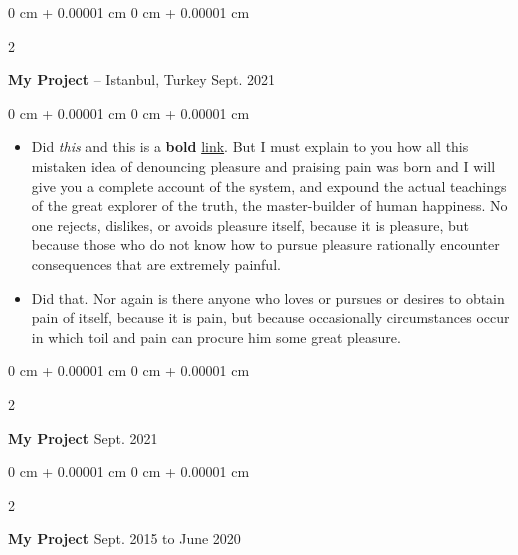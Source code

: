 \documentclass[10pt, letterpaper]{article}
\newenvironment{highlights}{
    \begin{itemize}[
        topsep=0.10 cm,
        parsep=0.10 cm,
        partopsep=0pt,
        itemsep=0pt,
        leftmargin=0 cm + 10pt
    ]
}{
    \end{itemize}
} %
\newenvironment{onecolentry}{
    \begin{adjustwidth}{
        0 cm + 0.00001 cm
    }{
        0 cm + 0.00001 cm
    }
}{
    \end{adjustwidth}
} %
\newenvironment{twocolentry}[2][]{
    \onecolentry
    \def\secondColumn{#2}
    \setcolumnwidth{\fill, 4.5 cm}
    \begin{paracol}{2}
}{
    \switchcolumn \raggedleft \secondColumn
    \end{paracol}
    \endonecolentry
} %
\begin{document}
        \vspace{0.2 cm}

        \begin{twocolentry}{
            Sept. 2021
        }
            \textbf{My Project} -- Istanbul, Turkey\end{twocolentry}

        \vspace{0.10 cm}
        \begin{onecolentry}
            \begin{highlights}
                \item Did \textit{this} and this is a \textbf{bold} \href{https://example.com}{link}. But I must explain to you how all this mistaken idea of denouncing pleasure and praising pain was born and I will give you a complete account of the system, and expound the actual teachings of the great explorer of the truth, the master-builder of human happiness. No one rejects, dislikes, or avoids pleasure itself, because it is pleasure, but because those who do not know how to pursue pleasure rationally encounter consequences that are extremely painful.
                \item Did that. Nor again is there anyone who loves or pursues or desires to obtain pain of itself, because it is pain, but because occasionally circumstances occur in which toil and pain can procure him some great pleasure.
            \end{highlights}
        \end{onecolentry}


        \vspace{0.2 cm}

        \begin{twocolentry}{
            Sept. 2021
        }
            \textbf{My Project}\end{twocolentry}



        \vspace{0.2 cm}

        \begin{twocolentry}{
            Sept. 2015 to June 2020
        }
            \textbf{My Project}\end{twocolentry}
\end{document}
